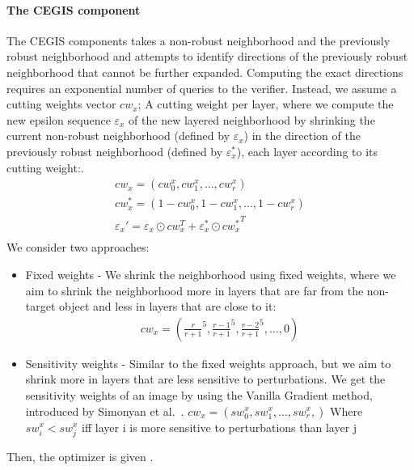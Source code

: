     \paragraph{The CEGIS component}
    The CEGIS components takes a non-robust neighborhood and the previously robust neighborhood and attempts to identify directions of the previously robust neighborhood that cannot be further expanded. %
    Computing the exact directions requires an exponential number of queries to the verifier.
    Instead, we assume a cutting weights vector $cw_x$;
    A cutting weight per layer, where we compute the new epsilon sequence $\varepsilon_x$ of the new layered neighborhood by shrinking the current non-robust neighborhood (defined by $\varepsilon_x$) in the direction of the previously robust neighborhood (defined by $\varepsilon_x^*$), each layer according to its cutting weight:.
    \begin{gather*}
        cw_x = (cw_0^x, cw_1^x, \ldots, cw_r^x)\\
        cw_x^* = (1 - cw_0^x, 1 - cw_1^x, \ldots, 1 - cw_r^x)\\
        {\varepsilon_x}' = \varepsilon_x \odot cw_x^T + \varepsilon_x^* \odot {cw_x^*}^T\\
    \end{gather*}
    We consider two approaches:
    \begin{itemize}
        \item Fixed weights - We shrink the neighborhood using fixed weights, where we aim to shrink the neighborhood more in layers that are far from the non-target object and less in layers that are close to it:
        \begin{gather*}
            cw_x = ({\frac{r}{r+1}}^5, {\frac{r-1}{r+1}}^5, {\frac{r-2}{r+1}}^5, \ldots, 0)
        \end{gather*}
        \item Sensitivity weights - Similar to the fixed weights approach, but we aim to shrink more in layers that are less sensitive to perturbations.
        We get the sensitivity weights of an image by using the Vanilla Gradient method, introduced by Simonyan et al.~\cite{VANILLAGRADIENT}.
        $cw_x = (sw_0^x, sw_1^x, \ldots, sw_r^x,)$
            Where $sw_i^x < sw_j^x$ iff layer i is more sensitive to perturbations than layer j
    \end{itemize}
    Then, the optimizer is given . %

